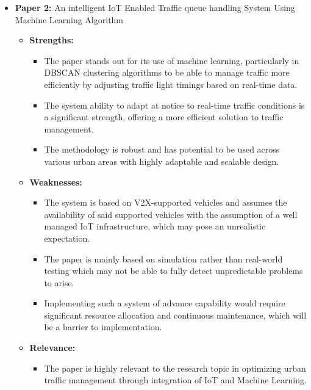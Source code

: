 \documentclass[12pt,a4paper]{article}
\begin{document}
\begin{itemize}
        \item \textbf{Paper 2:}  An intelligent IoT Enabled Traffic queue handling System Using Machine Learning Algorithm 
        
    \begin{itemize}
    
        \item \textbf{Strengths:}
        
                \begin{itemize}
            \item The paper stands out for its use of machine learning, particularly in DBSCAN clustering algorithms to be able to manage traffic more efficiently by adjusting traffic light timings based on real-time data. 
            \item The system ability to adapt at notice to real-time traffic conditions is a significant strength, offering a more efficient solution to traffic management. 
            \item The methodology is robust and has potential to be used across various urban areas with highly adaptable and scalable design. 
        \end{itemize}
        
        \item \textbf{Weaknesses:} 
        
                \begin{itemize}
            \item The system is based on V2X-supported vehicles and assumes the availability of said supported vehicles with the assumption of a well managed IoT infrastructure, which may pose an unrealistic expectation.
            \item The paper is mainly based on simulation rather than real-world testing which may not be able to fully detect unpredictable problems to arise. 
            \item Implementing such a system of advance capability would require significant resource allocation and continuous maintenance, which will be a barrier to implementation. 
        \end{itemize}
        
        \item \textbf{Relevance: } 
        
                \begin{itemize}
            \item The paper is highly relevant to the research topic in optimizing urban traffic management through integration of IoT and Machine Learning.  
        \end{itemize}
    \end{itemize}
    

\end{itemize}
\end{document}
